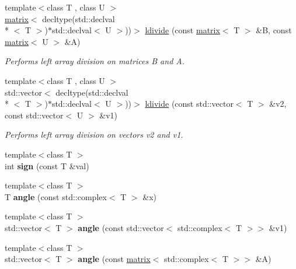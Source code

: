 \begin{DoxyCompactItemize}
{\footnotesize template$<$class T , class U $>$ }\\\hyperlink{classkeycpp_1_1matrix}{matrix}$<$ decltype(std\-::declval\\*
$<$ T $>$)$\ast$std\-::declval$<$ U $>$))$>$ \hyperlink{namespacekeycpp_ac57d32902cba2c399475015235aeccec}{ldivide} (const \hyperlink{classkeycpp_1_1matrix}{matrix}$<$ T $>$ \&B, const \hyperlink{classkeycpp_1_1matrix}{matrix}$<$ U $>$ \&A)
\begin{DoxyCompactList}\small\item\em Performs left array division on matrices B and A. \end{DoxyCompactList}\item 
{\footnotesize template$<$class T , class U $>$ }\\std\-::vector$<$ decltype(std\-::declval\\*
$<$ T $>$)$\ast$std\-::declval$<$ U $>$))$>$ \hyperlink{namespacekeycpp_a7a86bc7e25833cdf9266c038a4edb0ea}{ldivide} (const std\-::vector$<$ T $>$ \&v2, const std\-::vector$<$ U $>$ \&v1)
\begin{DoxyCompactList}\small\item\em Performs left array division on vectors v2 and v1. \end{DoxyCompactList}\item 
\hypertarget{namespacekeycpp_a87f2917e6a7c8e20d010aea0d8480668}{{\footnotesize template$<$class T $>$ }\\int {\bfseries sign} (const T \&val)}\label{namespacekeycpp_a87f2917e6a7c8e20d010aea0d8480668}

\item 
\hypertarget{namespacekeycpp_aaa2e17334911e8a447a5ef6c0cc54c3f}{{\footnotesize template$<$class T $>$ }\\T {\bfseries angle} (const std\-::complex$<$ T $>$ \&x)}\label{namespacekeycpp_aaa2e17334911e8a447a5ef6c0cc54c3f}

\item 
\hypertarget{namespacekeycpp_a9aed8b7c5c058bda28186010d2f3833f}{{\footnotesize template$<$class T $>$ }\\std\-::vector$<$ T $>$ {\bfseries angle} (const std\-::vector$<$ std\-::complex$<$ T $>$$>$ \&v1)}\label{namespacekeycpp_a9aed8b7c5c058bda28186010d2f3833f}

\item 
\hypertarget{namespacekeycpp_af0c9c769d613f7526406ecf3b3351d89}{{\footnotesize template$<$class T $>$ }\\std\-::vector$<$ T $>$ {\bfseries angle} (const \hyperlink{classkeycpp_1_1matrix}{matrix}$<$ std\-::complex$<$ T $>$$>$ \&A)}\label{namespacekeycpp_af0c9c769d613f7526406ecf3b3351d89}


\end{DoxyCompactItemize}

